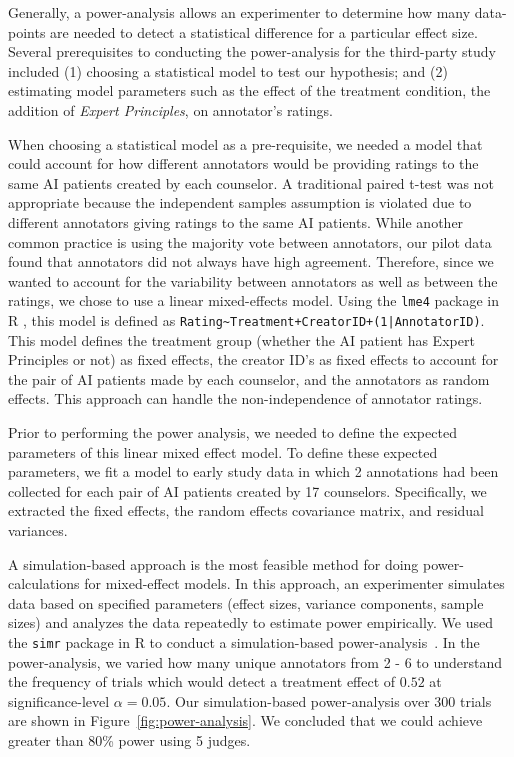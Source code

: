\documentclass[11pt]{article}
\begin{document}
Generally, a power-analysis allows an experimenter to determine how many data-points are needed to detect a statistical difference for a particular effect size. Several prerequisites to conducting the power-analysis for the third-party study included (1) choosing a statistical model to test our hypothesis; and (2) estimating model parameters such as the effect of the treatment condition, the addition of  \textit{Expert Principles}, on annotator's ratings.

When choosing a statistical model as a pre-requisite, we needed a model that could account for how different annotators would be providing ratings to the same AI patients created by each counselor. A traditional paired t-test was not appropriate because the independent samples assumption is violated due to different annotators giving ratings to the same AI patients. While another common practice is using the majority vote between annotators, our pilot data found that annotators did not always have high agreement. Therefore, since we wanted to account for the variability between annotators as well as between the ratings, we chose to use a linear mixed-effects model.  Using the \lstinline!lme4! package in R \cite{bates2015package}, this model is defined as \lstinline!Rating~Treatment+CreatorID+(1|AnnotatorID)!.  This model defines the treatment group (whether the AI patient has Expert Principles or not) as fixed effects, the creator ID's as fixed effects to account for the pair of AI patients made by each counselor, and the annotators as random effects. This approach can handle the non-independence of annotator ratings.

Prior to performing the power analysis, we needed to define the expected parameters of this linear mixed effect model. To define these expected parameters, we fit a model to early study data in which 2 annotations had been collected for each pair of AI patients created by 17 counselors. Specifically, we extracted the fixed effects, the random effects covariance matrix, and residual variances. 

A simulation-based approach is the most feasible method for doing power-calculations for mixed-effect models. In this approach, an experimenter simulates data based on specified parameters (effect sizes, variance components, sample sizes) and analyzes the data repeatedly to estimate power empirically. We used the \lstinline!simr! package in R to conduct a simulation-based power-analysis~\cite{green2016simr}. In the power-analysis, we varied how many unique annotators from 2 - 6 to understand the frequency of trials which would detect a treatment effect of $0.52$ at significance-level $\alpha=0.05$. Our simulation-based power-analysis over 300 trials are shown in Figure~\ref{fig:power-analysis}. We concluded that we could achieve greater than 80\% power using 5 judges. 
\end{document}
